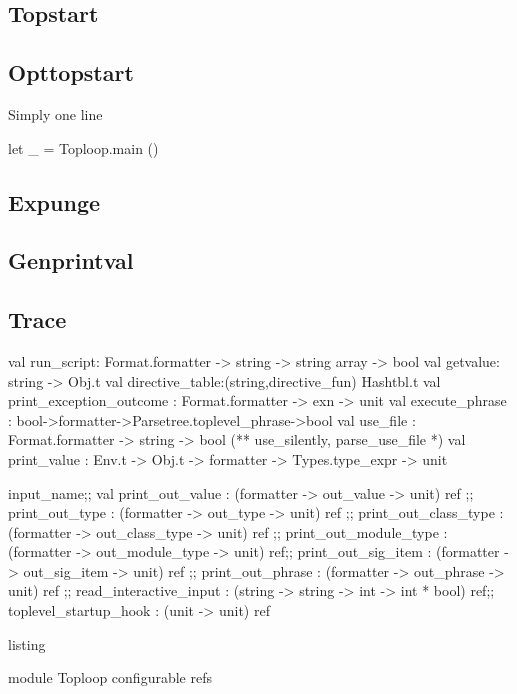 \subsection{Topstart}
\subsection{Opttopstart}
Simply one line 
\begin{ocamlcode}
let _ = Toploop.main ()
\end{ocamlcode}


\subsection{Expunge}

\subsection{Genprintval}
\subsection{Trace}





\begin{ocamlcode}
  val run_script: Format.formatter -> string -> string array -> bool
  val getvalue: string -> Obj.t
  val directive_table:(string,directive_fun) Hashtbl.t
  val print_exception_outcome : Format.formatter -> exn -> unit 
  val execute_phrase :
  bool->formatter->Parsetree.toplevel_phrase->bool
  val use_file : Format.formatter -> string -> bool
  (** use_silently, parse_use_file *)
  val print_value : Env.t -> Obj.t -> formatter ->
  Types.type_expr ->  unit
\end{ocamlcode}

\begin{ocamlcode}
  input_name;;
  val print_out_value : (formatter -> out_value -> unit) ref ;;
  print_out_type  : (formatter -> out_type -> unit) ref ;;
  print_out_class_type : (formatter -> out_class_type -> unit) ref ;;
  print_out_module_type : (formatter -> out_module_type -> unit) ref;;
  print_out_sig_item : (formatter -> out_sig_item -> unit) ref ;;
  print_out_phrase : (formatter -> out_phrase -> unit) ref ;;
  read_interactive_input :  (string -> string -> int -> int * bool)  ref;;
  toplevel_startup_hook : (unit -> unit) ref 
\end{ocamlcode}
\caption{listing}{module Toploop configurable refs}

